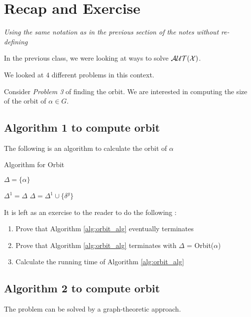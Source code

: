 


\section{Recap and Exercise}
\textit{Using the same notation as in the previous section of the notes without re-defining}

In the previous class, we were looking at ways to solve $\cal{AUT}(X)$. 

We looked at $4$ different problems in this context. 

Consider \emph{Problem 3} of finding the orbit. We are interested in computing 
the size of the orbit of  $\alpha \in G$.

\subsection{Algorithm 1 to compute orbit}
The following is an algorithm to calculate the orbit of $\alpha$


\begin{algorithm}
\caption{Algorithm for Orbit}\label{orbit}
\label{alg:orbit_alg}
\begin{algorithmic}[1]
\State $\Delta = \lbrace \alpha \rbrace$

\Repeat{}
\State $\Delta^1 = \Delta$
\State $\Delta = \Delta^1 \cup \lbrace \delta^g \rbrace$
\EndFor
\Until {$\Delta^1 \neq \Delta$}
\EndProcedure
\end{algorithmic}
\end{algorithm}

It is left as an exercise to the reader to do the following :
\begin{enumerate}
\item Prove that Algorithm \ref{alg:orbit_alg} eventually terminates
\item Prove that Algorithm \ref{alg:orbit_alg} terminates with $\Delta$ = Orbit($\alpha$)
\item Calculate the running time of Algorithm \ref{alg:orbit_alg}
\end{enumerate}

\subsection{Algorithm 2 to compute orbit}
The problem can be solved by a graph-theoretic approach.

